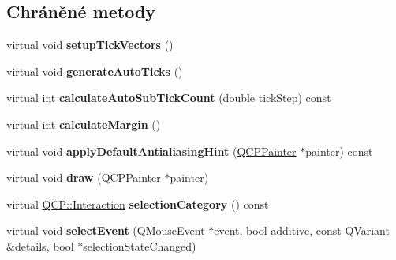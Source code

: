\subsection*{Chráněné metody}
\begin{DoxyCompactItemize}
\item 
\hypertarget{classQCPAxis_a57d9e961bae7d62f5b4e1f143e660c78}{}virtual void {\bfseries setup\+Tick\+Vectors} ()\label{classQCPAxis_a57d9e961bae7d62f5b4e1f143e660c78}

\item 
\hypertarget{classQCPAxis_a626eef437c874148df1a5ac78506d463}{}virtual void {\bfseries generate\+Auto\+Ticks} ()\label{classQCPAxis_a626eef437c874148df1a5ac78506d463}

\item 
\hypertarget{classQCPAxis_a3c5c045019fcdc0843a3e064eda7478a}{}virtual int {\bfseries calculate\+Auto\+Sub\+Tick\+Count} (double tick\+Step) const \label{classQCPAxis_a3c5c045019fcdc0843a3e064eda7478a}

\item 
\hypertarget{classQCPAxis_a47bdb0a55de6759489ee47665199aebb}{}virtual int {\bfseries calculate\+Margin} ()\label{classQCPAxis_a47bdb0a55de6759489ee47665199aebb}

\item 
\hypertarget{classQCPAxis_a13bde39eb1e0b7c14a02935689be8aba}{}virtual void {\bfseries apply\+Default\+Antialiasing\+Hint} (\hyperlink{classQCPPainter}{Q\+C\+P\+Painter} $\ast$painter) const \label{classQCPAxis_a13bde39eb1e0b7c14a02935689be8aba}

\item 
\hypertarget{classQCPAxis_a258b1e783eda5cd14ec5552c696a424e}{}virtual void {\bfseries draw} (\hyperlink{classQCPPainter}{Q\+C\+P\+Painter} $\ast$painter)\label{classQCPAxis_a258b1e783eda5cd14ec5552c696a424e}

\item 
\hypertarget{classQCPAxis_aca53b2f365dfc1257cba9e62395aa68f}{}virtual \hyperlink{namespaceQCP_a2ad6bb6281c7c2d593d4277b44c2b037}{Q\+C\+P\+::\+Interaction} {\bfseries selection\+Category} () const \label{classQCPAxis_aca53b2f365dfc1257cba9e62395aa68f}

\item 
\hypertarget{classQCPAxis_aa8a5fe80e2898ec08ada26b5fbee9eca}{}virtual void {\bfseries select\+Event} (Q\+Mouse\+Event $\ast$event, bool additive, const Q\+Variant \&details, bool $\ast$selection\+State\+Changed)\label{classQCPAxis_aa8a5fe80e2898ec08ada26b5fbee9eca}


\end{DoxyCompactItemize}
